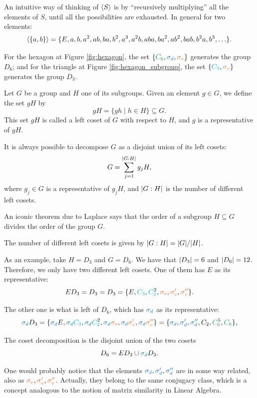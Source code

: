 \begin{example}
An intuitive way of thinking of $\ev{S}$ is by ``recursively multiplying'' all the elements of $S$, until all the possibilities are exhausted. In general for two elements:
$$
\ev{\{a,b\}} = \{E, a, b, a^2, ab, ba, b^2, a^3, a^2b, aba, ba^2, ab^2, bab, b^2a, b^3, \ldots\}.
$$

For the hexagon at Figure \ref{fig:hexagon}, the set $\{\Cs, \sd, \sv\}$ generates the group $D_6$; and for the triangle at Figure \ref{fig:hexagon_subgroup}, the set $\{\Ct, \sv\}$ generates the group $D_3$.
\end{example}


\begin{definition}
Let $G$ be a group and $H$ one of its subgroups. Given an element $g \in G$, we define the set $gH$ by
$$
gH = \{g h \mid h \in H\} \subseteq G.
$$
This set $gH$ is called a left coset of $G$ with respect to $H$, and $g$ is a representative of $gH$.

It is always possible to decompose $G$ as a disjoint union of its left cosets:
$$
G = \sum_{j=1}^{\abs{G:H}} g_j H,
$$
where $g_j \in G$ is a representative of $g_j H$, and $\abs{G:H}$ is the number of different left cosets.
\end{definition}

An iconic theorem due to Laplace says that the order of a subgroup $H \subseteq G$ divides the order of the group $G$.

\begin{theorem}
The number of different left cosets is given by $\abs{G:H} = \abs{G} / \abs{H}$.
\end{theorem}

\begin{example}
As an example, take $H = D_3$ and $G = D_6$. We have that $\abs{D_3}=6$ and $\abs{D_6} = 12$. Therefore, we only have two different left cosets. One of them has $E$ as its representative:
$$
E D_3 = D_3 = D_3 = \{E, \Ct, \Ctn{2}, \sv, \svp, \svpp\}.
$$

The other one is what is left of $D_6$, which has $\sd$ as its representative:
$$
\sd D_3 = \{\sd E, \sd \Ct, \sd \Ctn{2}, \sd \sv, \sd \svp, \sd \svpp\}
= \{ \sd, \sdp, \sdpp, C_2, \Csn{5}, \Cs \},
$$

The coset decomposition is the disjoint union of the two cosets
$$
D_6 = ED_3 \cup \sd D_3.
$$
\end{example}

One would probably notice that the elements $\sd, \sdp, \sdpp$ are in some way related, also as $\sv, \svp, \svpp$. Actually, they belong to the same conjugacy class, which is a concept analogous to the notion of matrix similarity in Linear Algebra.

